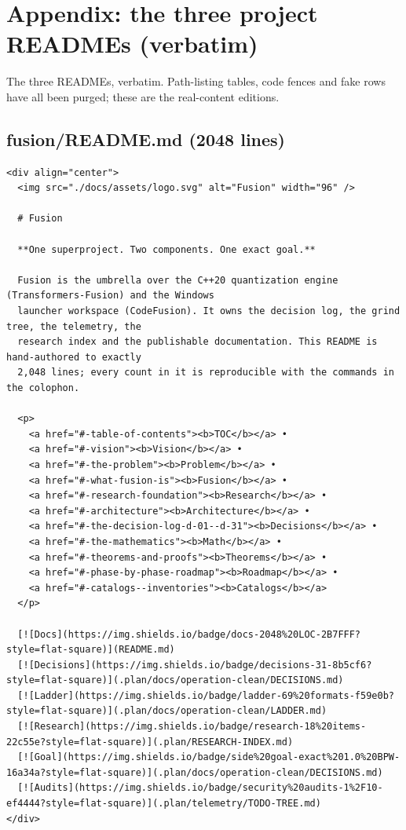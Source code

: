 \chapter{Appendix: the three project READMEs (verbatim)}

\noindent The three READMEs, verbatim. Path-listing tables, code fences and fake rows\\
\noindent have all been purged; these are the real-content editions.\\

\section*{fusion/README.md (2048 lines)}
\begingroup\begin{Verbatim}[breaklines,breakanywhere,fontsize=\footnotesize]
<div align="center">
  <img src="./docs/assets/logo.svg" alt="Fusion" width="96" />

  # Fusion

  **One superproject. Two components. One exact goal.**

  Fusion is the umbrella over the C++20 quantization engine (Transformers-Fusion) and the Windows
  launcher workspace (CodeFusion). It owns the decision log, the grind tree, the telemetry, the
  research index and the publishable documentation. This README is hand-authored to exactly
  2,048 lines; every count in it is reproducible with the commands in the colophon.

  <p>
    <a href="#-table-of-contents"><b>TOC</b></a> •
    <a href="#-vision"><b>Vision</b></a> •
    <a href="#-the-problem"><b>Problem</b></a> •
    <a href="#-what-fusion-is"><b>Fusion</b></a> •
    <a href="#-research-foundation"><b>Research</b></a> •
    <a href="#-architecture"><b>Architecture</b></a> •
    <a href="#-the-decision-log-d-01--d-31"><b>Decisions</b></a> •
    <a href="#-the-mathematics"><b>Math</b></a> •
    <a href="#-theorems-and-proofs"><b>Theorems</b></a> •
    <a href="#-phase-by-phase-roadmap"><b>Roadmap</b></a> •
    <a href="#-catalogs--inventories"><b>Catalogs</b></a>
  </p>

  [![Docs](https://img.shields.io/badge/docs-2048%20LOC-2B7FFF?style=flat-square)](README.md)
  [![Decisions](https://img.shields.io/badge/decisions-31-8b5cf6?style=flat-square)](.plan/docs/operation-clean/DECISIONS.md)
  [![Ladder](https://img.shields.io/badge/ladder-69%20formats-f59e0b?style=flat-square)](.plan/docs/operation-clean/LADDER.md)
  [![Research](https://img.shields.io/badge/research-18%20items-22c55e?style=flat-square)](.plan/RESEARCH-INDEX.md)
  [![Goal](https://img.shields.io/badge/side%20goal-exact%201.0%20BPW-16a34a?style=flat-square)](.plan/docs/operation-clean/DECISIONS.md)
  [![Audits](https://img.shields.io/badge/security%20audits-1%2F10-ef4444?style=flat-square)](.plan/telemetry/TODO-TREE.md)
</div>


\end{Verbatim}
